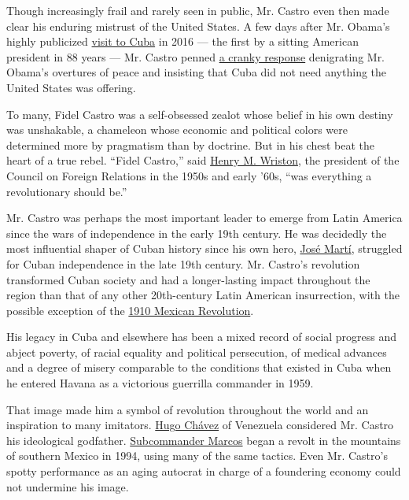 Though increasingly frail and rarely seen in public, Mr. Castro even
then made clear his enduring mistrust of the United States. A few days
after Mr. Obama's highly publicized
\href{http://www.nytimes.com/2016/03/21/world/americas/obama-arrives-in-cuba.html}{visit
to Cuba} in 2016 --- the first by a sitting American president in 88
years --- Mr. Castro penned
\href{http://www.nytimes.com/2016/03/29/world/americas/fidel-castro-criticizes-barack-obamas-efforts-to-change-cuba.html}{a
cranky response} denigrating Mr. Obama's overtures of peace and
insisting that Cuba did not need anything the United States was
offering.

To many, Fidel Castro was a self-obsessed zealot whose belief in his own
destiny was unshakable, a chameleon whose economic and political colors
were determined more by pragmatism than by doctrine. But in his chest
beat the heart of a true rebel. ``Fidel Castro,'' said
\href{http://www.nytimes.com/1978/03/09/archives/henry-wriston-dies-brown-head-193755-educator-88-helped-to-draw-up.html}{Henry
M. Wriston}, the president of the Council on Foreign Relations in the
1950s and early '60s, ``was everything a revolutionary should be.''

Mr. Castro was perhaps the most important leader to emerge from Latin
America since the wars of independence in the early 19th century. He was
decidedly the most influential shaper of Cuban history since his own
hero,
\href{http://academic.eb.com/EBchecked/topic/366828/Jose-Julian-Marti}{José
Martí}, struggled for Cuban independence in the late 19th century. Mr.
Castro's revolution transformed Cuban society and had a longer-lasting
impact throughout the region than that of any other 20th-century Latin
American insurrection, with the possible exception of the
\href{http://www.nytimes.com/1988/03/13/books/history-out-of-chaos.html?pagewanted=all}{1910
Mexican Revolution}.

His legacy in Cuba and elsewhere has been a mixed record of social
progress and abject poverty, of racial equality and political
persecution, of medical advances and a degree of misery comparable to
the conditions that existed in Cuba when he entered Havana as a
victorious guerrilla commander in 1959.

That image made him a symbol of revolution throughout the world and an
inspiration to many imitators.
\href{http://www.nytimes.com/2013/03/06/world/americas/hugo-chavez-venezuelas-polarizing-leader-dies-at-58.html}{Hugo
Chávez} of Venezuela considered Mr. Castro his ideological godfather.
\href{http://www.nytimes.com/1994/02/21/world/how-a-revolution-survived-a-mexican-chronicle.html}{Subcommander
Marcos} began a revolt in the mountains of southern Mexico in 1994,
using many of the same tactics. Even Mr. Castro's spotty performance as
an aging autocrat in charge of a foundering economy could not undermine
his image.

